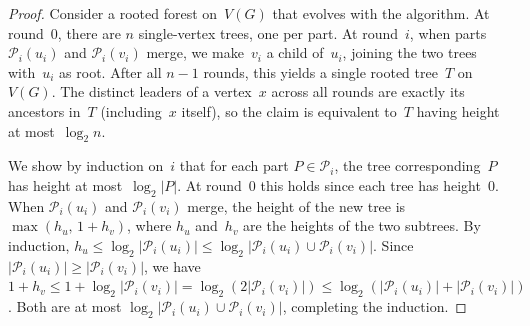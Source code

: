 \documentclass[11pt]{article}
\theoremstyle{definition}
\renewcommand{\leq}{\leqslant}
\renewcommand{\geq}{\geqslant}
\newcommand{\Pp}{\mathcal{P}}
\begin{document}
\numberOfLeaders*
\begin{proof}
    Consider a rooted forest on~$V(G)$ that evolves with the algorithm.
    At round~$0$, there are $n$ single-vertex trees, one per part.
    At round~$i$, when parts $\Pp_i(u_i)$ and $\Pp_i(v_i)$ merge, we make~$v_i$ a child of~$u_i$, joining the two trees with~$u_i$ as root.
    After all $n{-}1$ rounds, this yields a single rooted tree~$T$ on~$V(G)$.
    The distinct leaders of a vertex~$x$ across all rounds are exactly its ancestors in~$T$ (including~$x$ itself), so the claim is equivalent to~$T$ having height at most~$\log_2 n$.

    We show by induction on~$i$ that for each part $P \in \Pp_i$, the tree corresponding~$P$ has height at most~$\log_2 |P|$.
    At round~$0$ this holds since each tree has height~$0$.
    When $\Pp_i(u_i)$ and $\Pp_i(v_i)$ merge, the height of the new tree is $\max(h_u,\, 1 + h_v)$, where $h_u$ and~$h_v$ are the heights of the two subtrees.
    By induction, $h_u \leq \log_2 |\Pp_i(u_i)| \leq \log_2 |\Pp_i(u_i) \cup \Pp_i(v_i)|$.
    Since $|\Pp_i(u_i)| \geq |\Pp_i(v_i)|$, we have $1 + h_v \leq 1 + \log_2 |\Pp_i(v_i)| = \log_2(2|\Pp_i(v_i)|) \leq \log_2(|\Pp_i(u_i)| + |\Pp_i(v_i)|)$.
    Both are at most $\log_2 |\Pp_i(u_i) \cup \Pp_i(v_i)|$, completing the induction.
\end{proof}
\end{document}
